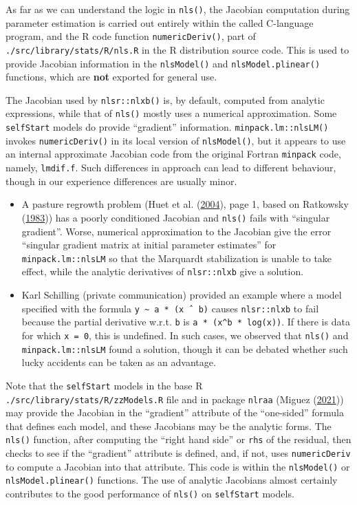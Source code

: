 \documentclass[
]{article}
\begin{document}
As far as we can understand the logic in \texttt{nls()}, the Jacobian
computation during parameter estimation is carried out entirely within
the called C-language program, and the R code function
\texttt{numericDeriv()}, part of \texttt{./src/library/stats/R/nls.R} in
the R distribution source code. This is used to provide Jacobian
information in the \texttt{nlsModel()} and \texttt{nlsModel.plinear()}
functions, which are \textbf{not} exported for general use.

The Jacobian used by \texttt{nlsr::nlxb()} is, by default, computed from
analytic expressions, while that of \texttt{nls()} mostly uses a
numerical approximation. Some \texttt{selfStart} models do provide
``gradient'' information. \texttt{minpack.lm::nlsLM()} invokes
\texttt{numericDeriv()} in its local version of \texttt{nlsModel()}, but
it appears to use an internal approximate Jacobian code from the
original Fortran \texttt{minpack} code, namely, \texttt{lmdif.f}. Such
differences in approach can lead to different behaviour, though in our
experience differences are usually minor.

\begin{itemize}
\item
  A pasture regrowth problem (Huet et al.
  (\protect\hyperlink{ref-Huet2004}{2004}), page 1, based on Ratkowsky
  (\protect\hyperlink{ref-Ratkowsky1983}{1983})) has a poorly
  conditioned Jacobian and \texttt{nls()} fails with ``singular
  gradient''. Worse, numerical approximation to the Jacobian give the
  error ``singular gradient matrix at initial parameter estimates'' for
  \texttt{minpack.lm::nlsLM} so that the Marquardt stabilization is
  unable to take effect, while the analytic derivatives of
  \texttt{nlsr::nlxb} give a solution.
\item
  Karl Schilling (private communication) provided an example where a
  model specified with the formula
  \texttt{y\ \textasciitilde{}\ a\ *\ (x\ ˆ\ b)} causes
  \texttt{nlsr::nlxb} to fail because the partial derivative w.r.t.
  \texttt{b} is \texttt{a\ *\ (x\^{}b\ *\ log(x))}. If there is data for
  which \texttt{x\ =\ 0}, this is undefined. In such cases, we observed
  that \texttt{nls()} and \texttt{minpack.lm::nlsLM} found a solution,
  though it can be debated whether such lucky accidents can be taken as
  an advantage.
\end{itemize}

Note that the \texttt{selfStart} models in the base R
\texttt{./src/library/stats/R/zzModels.R} file and in package
\texttt{nlraa} (Miguez (\protect\hyperlink{ref-MiguezNLRAA2021}{2021}))
may provide the Jacobian in the ``gradient'' attribute of the
``one-sided'' formula that defines each model, and these Jacobians may
be the analytic forms. The \texttt{nls()} function, after computing the
``right hand side'' or \texttt{rhs} of the residual, then checks to see
if the ``gradient'' attribute is defined, and, if not, uses
\texttt{numericDeriv} to compute a Jacobian into that attribute. This
code is within the \texttt{nlsModel()} or \texttt{nlsModel.plinear()}
functions. The use of analytic Jacobians almost certainly contributes to
the good performance of \texttt{nls()} on \texttt{selfStart} models.
\end{document}
